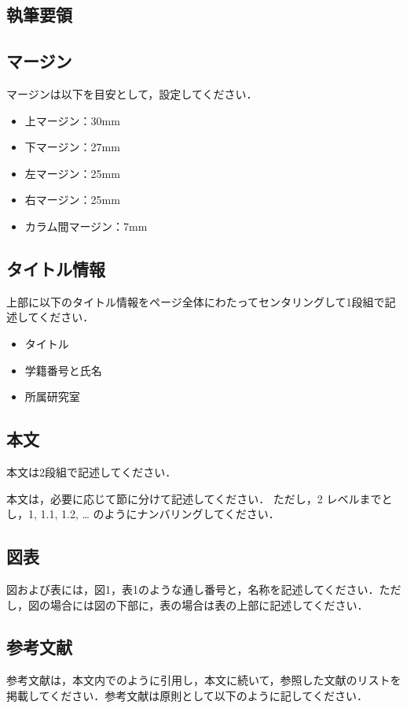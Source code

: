 \documentclass[a4paper, 9pt]{jarticle}
\begin{document}
\begin{論文概要}
\section{執筆要領}

\subsection{マージン}
マージンは以下を目安として，設定してください．

\begin{itemize}
\item 上マージン：30mm
\item 下マージン：27mm
\item 左マージン：25mm
\item 右マージン：25mm
\item カラム間マージン：7mm
\end{itemize}

\subsection{タイトル情報}
上部に以下のタイトル情報をページ全体にわたってセンタリングして1段組で記述してください．

\begin{itemize}
\item タイトル
\item 学籍番号と氏名
\item 所属研究室
\end{itemize}

\subsection{本文}
本文は2段組で記述してください．

本文は，必要に応じて節に分けて記述してください．
ただし，2 レベルまでとし，1, 1.1, 1.2, … のようにナンバリングしてください．

\subsection{図表}
図および表には，図1，表1のような通し番号と，名称を記述してください．ただし，図の場合には図の下部に，表の場合は表の上部に記述してください．

\subsection{参考文献}
参考文献は，本文内で\cite{paper1}\cite{paper2}のように引用し，本文に続いて，参照した文献のリストを掲載してください．参考文献は原則として以下のように記してください．


\end{論文概要}
\end{document}
